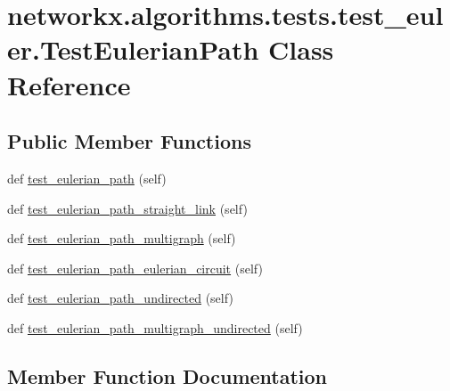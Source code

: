 \hypertarget{classnetworkx_1_1algorithms_1_1tests_1_1test__euler_1_1TestEulerianPath}{}\section{networkx.\+algorithms.\+tests.\+test\+\_\+euler.\+Test\+Eulerian\+Path Class Reference}
\label{classnetworkx_1_1algorithms_1_1tests_1_1test__euler_1_1TestEulerianPath}
\subsection*{Public Member Functions}
\begin{DoxyCompactItemize}
\item 
def \hyperlink{classnetworkx_1_1algorithms_1_1tests_1_1test__euler_1_1TestEulerianPath_acbefaeaa23758e122765b96edf6756ce}{test\+\_\+eulerian\+\_\+path} (self)
\item 
def \hyperlink{classnetworkx_1_1algorithms_1_1tests_1_1test__euler_1_1TestEulerianPath_a4fda688649fd158fdc053dbef2dd6bab}{test\+\_\+eulerian\+\_\+path\+\_\+straight\+\_\+link} (self)
\item 
def \hyperlink{classnetworkx_1_1algorithms_1_1tests_1_1test__euler_1_1TestEulerianPath_a5421b644f7bf4af2051523b75316f026}{test\+\_\+eulerian\+\_\+path\+\_\+multigraph} (self)
\item 
def \hyperlink{classnetworkx_1_1algorithms_1_1tests_1_1test__euler_1_1TestEulerianPath_a1e3a29262bb97f86fde1cd9fc96a212d}{test\+\_\+eulerian\+\_\+path\+\_\+eulerian\+\_\+circuit} (self)
\item 
def \hyperlink{classnetworkx_1_1algorithms_1_1tests_1_1test__euler_1_1TestEulerianPath_a73049fcf9b844ed61a7877f9c6c487d5}{test\+\_\+eulerian\+\_\+path\+\_\+undirected} (self)
\item 
def \hyperlink{classnetworkx_1_1algorithms_1_1tests_1_1test__euler_1_1TestEulerianPath_a084786d77cf05e197bfee7a0a6b8ffec}{test\+\_\+eulerian\+\_\+path\+\_\+multigraph\+\_\+undirected} (self)
\end{DoxyCompactItemize}


\subsection{Member Function Documentation}
\mbox{\label{classnetworkx_1_1algorithms_1_1tests_1_1test__euler_1_1TestEulerianPath_acbefaeaa23758e122765b96edf6756ce}} 
